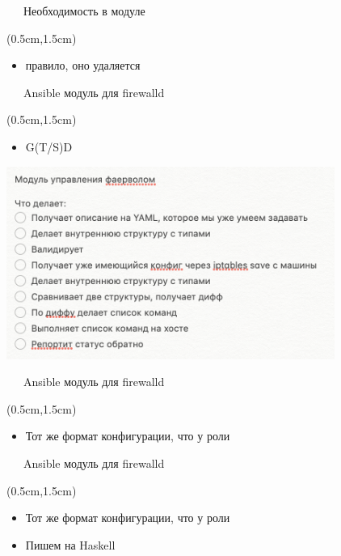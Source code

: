 \documentclass[xetex,18pt,aspectratio=43]{beamer}
\begin{document}
\begin{Large}
\begin{frame}{\ \ \ Необходимость в модуле}
\begin{textblock*}{\framewidth-0.8cm}(0.5cm,1.5cm)
\begin{itemize}
  \item {\color {darkpastelgreen}{\bf Я удаляю} правило, оно удаляется}
\end{itemize}
\end{textblock*}
\end{frame}

\begin{frame}{\ \ \ Ansible модуль для firewalld}
\begin{textblock*}{\framewidth-0.8cm}(0.5cm,1.5cm)
\begin{itemize}
  \item G(T/S)D
\end{itemize}
\begin{minipage}{\textwidth}
  \centering
  \includegraphics[height=6.3cm]{img/plan}
\end{minipage}
\end{textblock*}
\end{frame}

\begin{frame}{\ \ \ Ansible модуль для firewalld}
\begin{textblock*}{\framewidth-0.8cm}(0.5cm,1.5cm)
\begin{itemize}
  \item Тот же формат конфигурации, что у роли
\end{itemize}
\end{textblock*}
\end{frame}

\begin{frame}{\ \ \ Ansible модуль для firewalld}
\begin{textblock*}{\framewidth-0.8cm}(0.5cm,1.5cm)
\begin{itemize}
  \item Тот же формат конфигурации, что у роли
  \item Пишем на Haskell
\end{itemize}
\end{textblock*}
\end{frame}


\end{Large}
\end{document}
